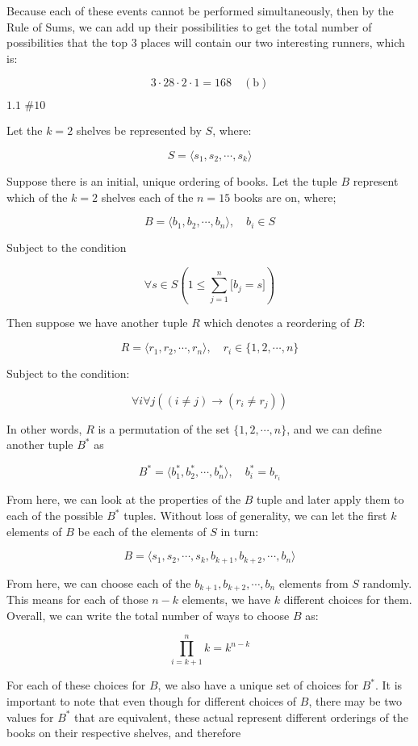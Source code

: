 \documentclass{article}
\newcommand{\problem}[2]{$\boxed{\text{#1 \##2}}$}
\newcommand{\subsolution}[2]{\boxed{#2\quad(\text{#1})}}
\newcommand{\ROS}{Rule of Sums}
\begin{document}
\begin{multicols*}{2}
\hspace{2em} Because each of these events cannot be performed
simultaneously, then by the \ROS, we can add up their possibilities to
get the total number of possibilities that the top 3 places will
contain our two interesting runners, which is:

\[
\subsolution{b}{3\cdot28\cdot2\cdot1=168}
\]

%
\problem{1.1}{10}

Let the $k=2$ shelves be represented by $S$, where:

\[
S=\langle s_1,s_2,\cdots,s_k\rangle
\]

Suppose there is an initial, unique ordering of books. Let the tuple
$B$ represent which of the $k=2$ shelves each of the $n=15$ books are
on, where;

\[
B=\langle b_1,b_2,\cdots,b_n\rangle,\quad b_i\in S
\]

Subject to the condition

\[
\forall s\in S\left(1\le\sum\limits_{j=1}^n\lbrack b_j=s\rbrack\right)
\]

Then suppose we have another tuple $R$ which denotes a reordering of
$B$:

\[
R=\langle r_1,r_2,\cdots,r_n\rangle,\quad r_i\in\{1,2,\cdots,n\}
\]

Subject to the condition:

\[
\forall i\forall j((i\ne j)\rightarrow(r_i\ne r_j))
\]

In other words, $R$ is a permutation of the set $\{1,2,\cdots,n\}$,
and we can define another tuple $B^*$ as

\[
B^*=\langle b^*_1,b^*_2,\cdots,b^*_n\rangle,\quad b^*_i=b_{r_i}
\]

From here, we can look at the properties of the $B$ tuple and later
apply them to each of the possible $B^*$ tuples. Without loss of
generality, we can let the first $k$ elements of $B$ be each of the
elements of $S$ in turn:

\[
B=\langle s_1, s_2,\cdots,s_k,b_{k+1},b_{k+2},\cdots,b_n\rangle
\]

From here, we can choose each of the $b_{k+1},b_{k+2},\cdots,b_n$
elements from $S$ randomly. This means for each of those $n-k$
elements, we have $k$ different choices for them. Overall, we can
write the total number of ways to choose $B$ as:

\[
\prod\limits_{i=k+1}^n k=k^{n-k}
\]

For each of these choices for $B$, we also have a unique set of
choices for $B^*$. It is important to note that even though for
different choices of $B$, there may be two values for $B^*$ that are
equivalent, these actual represent different orderings of the books on
their respective shelves, and therefore


\end{multicols*}
\end{document}
